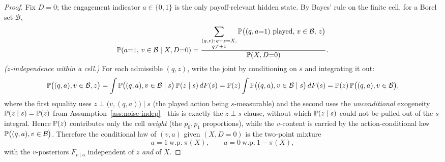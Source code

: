 \begin{proof}
Fix $D=0$; the engagement indicator $a\in\{0,1\}$ is the only payoff-relevant
hidden state. By Bayes' rule on the finite cell, for a Borel set $\mathcal B$,
\[
   \mathbb{P}(a{=}1,\,v\in\mathcal B\mid X,D{=}0)
   =\frac{\displaystyle\sum_{\substack{(q,z):\,q+z=X,\\ q\neq+1}}
          \mathbb{P}\bigl((q,a{=}1)\ \text{played},\,v\in\mathcal B,\,z\bigr)}
         {\mathbb{P}(X,D{=}0)} .
\]
\emph{($z$-independence within a cell.)} For each admissible $(q,z)$,
write the joint by conditioning on $s$ and integrating it out:
\[
   \mathbb{P}\bigl((q,a),v\in\mathcal B,z\bigr)
   =\int \mathbb{P}\bigl((q,a),v\in\mathcal B\mid s\bigr)\,\mathbb{P}(z\mid s)\,dF(s)
   =\mathbb{P}(z)\int \mathbb{P}\bigl((q,a),v\in\mathcal B\mid s\bigr)\,dF(s)
   =\mathbb{P}(z)\,\mathbb{P}\bigl((q,a),v\in\mathcal B\bigr),
\]
where the first equality uses $z\perp\bigl(v,(q,a)\bigr)\mid s$ (the played
action being $s$-measurable) and the second uses the \emph{unconditional}
exogeneity $\mathbb{P}(z\mid s)=\mathbb{P}(z)$ from Assumption~\ref{ass:noise-indep}---this is
exactly the $z\perp s$ clause, without which $\mathbb{P}(z\mid s)$ could not be pulled
out of the $s$-integral. Hence $\mathbb{P}(z)$ contributes only the cell \emph{weight}
(the $p_0,p_1$ proportions), while the $v$-content is carried by the
action-conditional law $\mathbb{P}\bigl((q,a),v\in\mathcal B\bigr)$. Therefore the
conditional law of $(v,a)$ given $(X,D{=}0)$ is the two-point mixture
\begin{equation}\label{eq:pooling}
   a=1\ \text{w.p.}\ \pi(X),\qquad a=0\ \text{w.p.}\ 1-\pi(X),
\end{equation}
with the $v$-posteriors $F_{v\mid a}$ independent of $z$ \emph{and} of $X$.


\end{proof}
